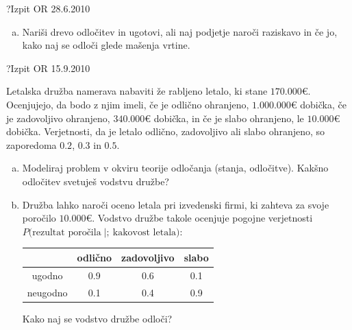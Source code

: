 \begin{naloga}{?}{Izpit OR 28.6.2010}
\begin{vprasanje}[bp]
\begin{enumerate}[(a)]
\item Nariši drevo odločitev in ugotovi,
ali naj podjetje naroči raziskavo in če jo,
kako naj se odloči glede mašenja vrtine.
\end{enumerate}
\end{vprasanje}
\begin{odgovor}
\end{odgovor}
\end{naloga}


\begin{naloga}{?}{Izpit OR 15.9.2010}
\begin{vprasanje}
Letalska družba namerava nabaviti že rabljeno letalo, ki stane $170.000 €$.
Ocenjujejo, da bodo z njim imeli,
če je odlično ohranjeno, $1.000.000 €$ dobička,
če je zadovoljivo ohranjeno, $340.000 €$ dobička,
in če je slabo ohranjeno, le $10.000 €$ dobička.
Verjetnosti, da je letalo odlično, zadovoljivo ali slabo ohranjeno,
so zaporedoma $0.2$, $0.3$ in $0.5$.
\begin{enumerate}[(a)]
\item Modeliraj problem v okviru teorije odločanja (stanja, odločitve).
Kakšno odločitev svetuješ vodstvu družbe?

\item Družba lahko naroči oceno letala pri izvedenski firmi,
ki zahteva za svoje poročilo $10.000 €$.
Vodstvo družbe takole ocenjuje pogojne verjetnosti
$P(\text{rezultat poročila} \;|;\ \text{kakovost letala)}$:
\begin{center}
\begin{tabular}{c|ccc}
& odlično & zadovoljivo & slabo \\ \hline
ugodno & 0.9 & 0.6 & 0.1 \\
neugodno & 0.1 & 0.4 & 0.9
\end{tabular}
\end{center}
Kako naj se vodstvo družbe odloči?
\end{enumerate}

\end{vprasanje}
\begin{odgovor}
\end{odgovor}
\end{naloga}


